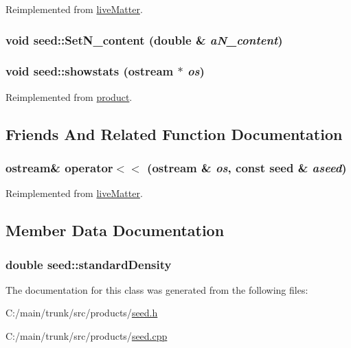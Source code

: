 Reimplemented from \hyperlink{classlive_matter_acaf1db5a1bb2fc9beb79002771f0282c}{liveMatter}.\hypertarget{classseed_afc3e85e33e9c79809a1c600e990d196a}{
\subsubsection[{SetN\_\-content}]{\setlength{\rightskip}{0pt plus 5cm}void seed::SetN\_\-content (double \& {\em aN\_\-content})}}
\label{classseed_afc3e85e33e9c79809a1c600e990d196a}
\hypertarget{classseed_aef923afa921c9ef6b772d0ee573159f4}{
\subsubsection[{showstats}]{\setlength{\rightskip}{0pt plus 5cm}void seed::showstats (ostream $\ast$ {\em os})}}
\label{classseed_aef923afa921c9ef6b772d0ee573159f4}


Reimplemented from \hyperlink{classproduct_a1151ea416ab90047f8d087be57a6d7b1}{product}.

\subsection{Friends And Related Function Documentation}
\hypertarget{classseed_addebb9c9bc7ceb6fadd6d3a86be76168}{
\subsubsection[{operator$<$$<$}]{\setlength{\rightskip}{0pt plus 5cm}ostream\& operator$<$$<$ (ostream \& {\em os}, \/  const {\bf seed} \& {\em aseed})}}
\label{classseed_addebb9c9bc7ceb6fadd6d3a86be76168}


Reimplemented from \hyperlink{classlive_matter_a694b548b571c88f71f2c7cc75b47d0fb}{liveMatter}.

\subsection{Member Data Documentation}
\hypertarget{classseed_ab6eef1e64e6ab26e4d0fce13ff9c3e40}{
\subsubsection[{standardDensity}]{\setlength{\rightskip}{0pt plus 5cm}double {\bf seed::standardDensity}}}
\label{classseed_ab6eef1e64e6ab26e4d0fce13ff9c3e40}


The documentation for this class was generated from the following files:\begin{DoxyCompactItemize}
\item 
C:/main/trunk/src/products/\hyperlink{seed_8h}{seed.h}\item 
C:/main/trunk/src/products/\hyperlink{seed_8cpp}{seed.cpp}\end{DoxyCompactItemize}
